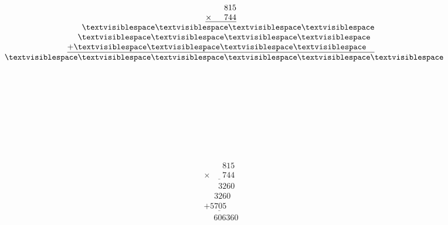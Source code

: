 \begin{minipage}[t]{0.3\linewidth}
\begin{align*}\begin{array}{c}
\phantom{
\times000
}
815\\
\underline{
\times
\phantom{
000
}
744
}\\
\phantom{
+00
}
\textvisiblespace
\textvisiblespace
\textvisiblespace
\textvisiblespace
\\
\phantom{
+0
}
\textvisiblespace
\textvisiblespace
\textvisiblespace
\textvisiblespace
\phantom0\\
\underline{
+
\textvisiblespace
\textvisiblespace
\textvisiblespace
\textvisiblespace
\phantom0\phantom0
}
\\
\phantom{+}
\textvisiblespace
\textvisiblespace
\textvisiblespace
\textvisiblespace
\textvisiblespace
\textvisiblespace
\end{array}\end{align*}
\end{minipage}
\begin{minipage}[t]{0.05\linewidth}
\begin{align*}\begin{array}{c}
\textvisiblespace
\\
\textvisiblespace
\\
\textvisiblespace
\\
\textvisiblespace
\\
\textvisiblespace
\\
\textvisiblespace
\end{array}\end{align*}
\end{minipage}
\begin{minipage}[t]{0.05\linewidth}
\begin{align*}\begin{array}{c}
\textvisiblespace
\end{array}\end{align*}
\end{minipage}
\begin{minipage}[t]{0.3\linewidth}
\begin{align*}\begin{array}{c}
\phantom{
\times000
}
815\\
\underline{
\times
\phantom{
000
}
744
}\\
\phantom{
+00
}
3260
\\
\phantom{
+0
}
3260
\phantom0\\
\underline{
+
5705
\phantom0\phantom0
}
\\
\phantom{+}
606360
\end{array}\end{align*}
\end{minipage}
